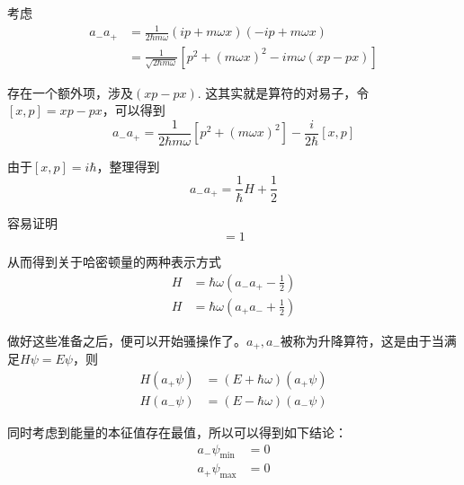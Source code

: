 \documentclass[UTF8]{ctexart}
\begin{document}
    考虑
    \begin{equation}
        \begin{aligned}
            a_{-}a_{+} &= \frac{1}{2 \hbar m \omega}(ip+m\omega x)(-ip + m\omega x) \\
            &=\frac{1}{\sqrt{2 \hbar m \omega}}\left[p^2 +(m\omega x)^2 - im \omega(xp-px) \right]
        \end{aligned}
    \end{equation}

存在一个额外项，涉及$(xp-px)$. 这其实就是算符的对易子，令$[x,p]=xp-px$，可以得到
\begin{equation}
    a_{-}a_{+} = \frac{1}{2 \hbar m \omega}\left[p^2 + (m \omega x)^2 \right]- \frac{i}{2 \hbar}\left[x,p\right]
\end{equation}

\noindent 由于$[x,p] = i \hbar$，整理得到
\begin{equation}
    a_{-}a_{+} = \frac{1}{\hbar} H + \frac{1}{2}
\end{equation}

    容易证明
    \begin{equation}
        [a_{-},a_{+}] = 1
    \end{equation}

\noindent 从而得到关于哈密顿量的两种表示方式
\begin{equation}
    \begin{aligned}
        H &= \hbar \omega \left(a_{-}a_{+}-\frac{1}{2}\right) \\ 
        H &= \hbar \omega \left(a_{+}a_{-}+ \frac{1}{2}\right)
    \end{aligned}
\end{equation}

    做好这些准备之后，便可以开始骚操作了。$a_{+}, a_{-}$被称为升降算符，这是由于当满足$H \psi = E \psi$，则
    \begin{equation}
        \begin{aligned}
            H (a_{+} \psi) &= (E+\hbar \omega)(a_{+} \psi) \\
            H (a_{-} \psi) &= (E-\hbar \omega) (a_{-} \psi)
        \end{aligned}
    \end{equation}

\noindent 同时考虑到能量的本征值存在最值，所以可以得到如下结论：
\begin{equation}
    \begin{aligned}
        a_{-} \psi_{\min} &= 0 \\
        a_{+} \psi_{\max} &=0
    \end{aligned}\label{equ2.6}
\end{equation}
\end{document}
